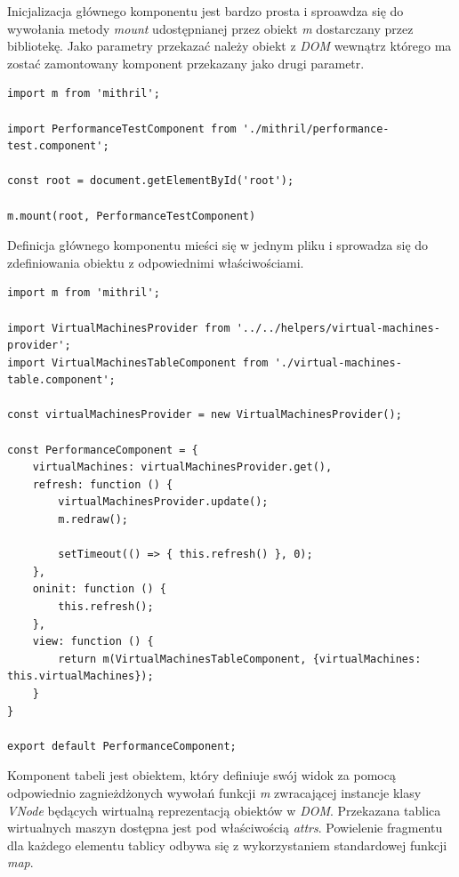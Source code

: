 \documentclass[polish, twoside, 12pt]{mwart}
\begin{document}
Inicjalizacja głównego komponentu jest bardzo prosta i sproawdza się do wywołania metody \emph{mount} udostępnianej przez obiekt \emph{m} dostarczany przez bibliotekę. Jako parametry przekazać należy obiekt z \emph{DOM} wewnątrz którego ma zostać zamontowany komponent przekazany jako drugi parametr.

\begin{lstlisting}[caption=Inicjalizacja głównego komponentu]
import m from 'mithril';

import PerformanceTestComponent from './mithril/performance-test.component';

const root = document.getElementById('root');

m.mount(root, PerformanceTestComponent)
\end{lstlisting}

Definicja głównego komponentu mieści się w jednym pliku i sprowadza się do zdefiniowania obiektu z odpowiednimi właściwościami.

\begin{lstlisting}[caption=Główny komponent]
import m from 'mithril';

import VirtualMachinesProvider from '../../helpers/virtual-machines-provider';
import VirtualMachinesTableComponent from './virtual-machines-table.component';

const virtualMachinesProvider = new VirtualMachinesProvider();

const PerformanceComponent = {
    virtualMachines: virtualMachinesProvider.get(),
    refresh: function () {
        virtualMachinesProvider.update();
        m.redraw();

        setTimeout(() => { this.refresh() }, 0);
    },
    oninit: function () {
        this.refresh();
    },
    view: function () {
        return m(VirtualMachinesTableComponent, {virtualMachines: this.virtualMachines});
    }
}

export default PerformanceComponent;
\end{lstlisting}

Komponent tabeli jest obiektem, który definiuje swój widok za pomocą odpowiednio zagnieżdżonych wywołań funkcji \emph{m} zwracającej instancje klasy \emph{VNode} będących wirtualną reprezentacją obiektów w \emph{DOM}. Przekazana tablica wirtualnych maszyn dostępna jest pod właściwością \emph{attrs}. Powielenie fragmentu dla każdego elementu tablicy odbywa się z wykorzystaniem standardowej funkcji \emph{map}.
\end{document}
